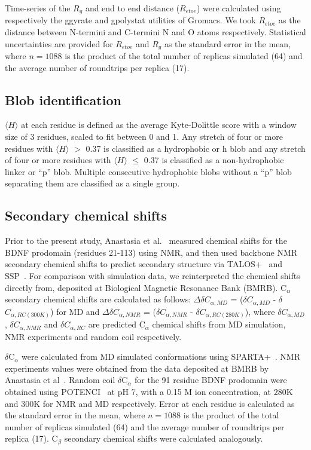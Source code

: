 \documentclass[10pt,letterpaper]{article}
\begin{document}
Time-series of the $R_g$ and end to end distance ($R_{etoe}$) were calculated using respectively the g\textunderscore gyrate and g\textunderscore polystat utilities of Gromacs. We took $R_{etoe}$ as the distance between N-termini and C-termini N and O atoms respectively. Statistical uncertainties are provided for $R_{etoe}$ and $R_g$ as the standard error in the mean, where $n = 1088$ is the product of the total number of replicas simulated (64) and the average number of roundtrips per replica (17). 


\subsection*{Blob identification} $\langle H\rangle$ at each residue is defined as the average Kyte-Dolittle\cite{Kyte1982a} score with a window size of 3 residues, scaled to fit between 0 and 1. Any stretch of four or more residues with $\langle H \rangle$ $>$ 0.37 is classified as a hydrophobic or h blob and any stretch of four or more residues with $\langle H \rangle$ $\leq$ 0.37 is classified as a non-hydrophobic linker or ``p'' blob. Multiple consecutive hydrophobic blobs without a ``p'' blob separating them are classified as a single group. 

\subsection*{Secondary chemical shifts} Prior to the present study, Anastasia et al.~\cite{Anastasia2013} measured chemical shifts for the BDNF prodomain (residues 21-113) using NMR, and then used backbone NMR secondary chemical shifts to predict secondary structure via TALOS+~\cite{Shen2009} and SSP~\cite{Marsh2006a}. For comparison with simulation data, we reinterpreted the chemical shifts directly from\cite{Anastasia2013}, deposited at Biological Magnetic Resonance Bank (BMRB). C$_{\alpha}$ secondary chemical shifts are calculated as follows: $\Delta$$\delta$$C_{\alpha,MD}$ = ($\delta$$C_{\alpha,MD}$ - $\delta$$C_{\alpha,RC(300K)}$) for MD and $\Delta$$\delta$$C_{\alpha, NMR}$ = ($\delta$$C_{\alpha, NMR}$ - $\delta$$C_{\alpha,RC(280K)}$), where $\delta$$C_{\alpha,MD}$, $\delta$$C_{\alpha,NMR}$ and $\delta$$C_{\alpha,RC}$ are predicted C$_{\alpha}$ chemical shifts from MD simulation, NMR experiments and random coil respectively. 

$\delta$C$_{\alpha}$ were calculated from MD simulated conformations using SPARTA+~\cite{Shen2010}. NMR experiments values were obtained from the data deposited at BMRB by Anastasia et al~\cite{Anastasia2013}.  
Random coil $\delta$C$_{\alpha}$ for the 91 residue BDNF prodomain were obtained using POTENCI~\cite{Nielsen2018} at pH 7, with a 0.15 M ion concentration, at 280K and 300K for NMR and MD respectively. Error at each residue is calculated as the standard error in the mean, where $n = 1088$ is the product of the total number of replicas simulated (64) and the average number of roundtrips per replica (17). C$_{\beta}$ secondary chemical shifts were calculated analogously.
\end{document}
